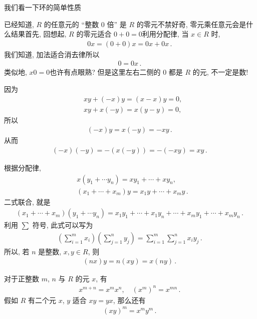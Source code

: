 \begin{remark}
    我们看一下环的简单性质\period

    已经知道, $R$ 的任意元的 ``整数 $0$ 倍'' 是 $R$ 的零元\period 不禁好奇, 零元乘任意元会是什么结果\period 首先, 回想起, $R$ 的零元适合 $0+0=0$\period 利用分配律, 当 $x \in R$ 时,
    \begin{align*}
        0x = (0+0)x = 0x + 0x\period
    \end{align*}
    我们知道, 加法适合消去律\period 所以
    \begin{align*}
        0 = 0x\period
    \end{align*}
    类似地, $x0 = 0$\period 也许有点眼熟? 但是这里左右二侧的 $0$ 都是 $R$ 的元, 不一定是数!

    因为
    \begin{align*}
         & xy + (-x)y = (x-x)y = 0, \\
         & xy + x(-y) = x(y-y) = 0,
    \end{align*}
    所以
    \begin{align*}
        (-x)y = x(-y) = -xy\period
    \end{align*}
    从而
    \begin{align*}
        (-x)(-y) = -(x(-y)) = -(-xy) = xy\period
    \end{align*}

    根据分配律,
    \begin{align*}
         & x (y_1 + \cdots y_n) = x y_1 + \cdots + x y_n,          \\
         & (x_1 + \cdots + x_m) y = x_1 y + \cdots + x_m y \period
    \end{align*}
    二式联合, 就是
    \begin{align*}
        (x_1 + \cdots + x_m)(y_1 + \cdots y_n) = x_1 y_1 + \cdots + x_1 y_n + \cdots + x_m y_1 + \cdots + x_m y_n \period
    \end{align*}
    利用 $\sum$ 符号, 此式可以写为
    \begin{align*}
        \left( \sum_{i=1}^{m} x_i \right) \left( \sum_{j=1}^{n} y_j \right) = \sum_{i=1}^{m} \sum_{j=1}^{n} x_i y_j \period
    \end{align*}
    所以, 若 $n$ 是整数, $x,y \in R$, 则
    \begin{align*}
        (nx)y = n(xy) = x(ny) \period
    \end{align*}

    对于正整数 $m$, $n$ 与 $R$ 的元 $x$, 有
    \begin{align*}
        x^{m+n} = x^m x^n, \quad (x^m)^n = x^{mn} \period
    \end{align*}
    假如 $R$ 有二个元 $x$, $y$ 适合 $xy = yx$, 那么还有
    \begin{align*}
        (xy)^m = x^m y^m \period
    \end{align*}
\end{remark}

